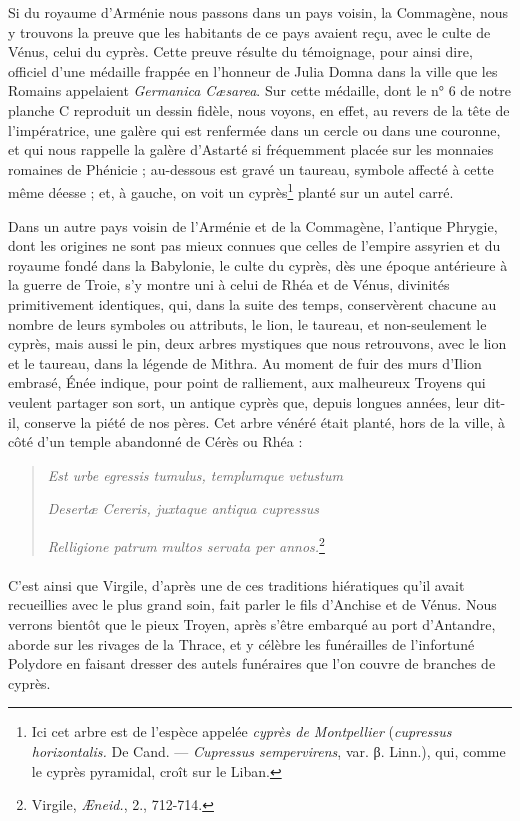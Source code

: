 \documentclass[a4paper, 11pt, oneside, polutonikogreek, french]{article}
\begin{document}
Si du royaume d'Arménie nous passons dans un pays voisin, la Commagène, nous y trouvons la preuve que les habitants de ce pays avaient reçu, avec le culte de Vénus, celui du cyprès. Cette preuve résulte du témoignage, pour ainsi dire, officiel d'une médaille frappée en l'honneur de Julia Domna dans la ville que les Romains appelaient \emph{Germanica Cæsarea}. Sur cette médaille, dont le n° 6 de notre planche C reproduit un dessin fidèle, nous voyons, en effet, au revers de la tête de l'impératrice, une galère qui est renfermée dans un cercle ou dans une couronne, et qui nous rappelle la galère d'Astarté si fréquemment placée sur les monnaies romaines de Phénicie ; au-dessous est gravé un taureau, symbole affecté à cette même déesse ; et, à gauche, on voit un cyprès\footnote{Ici cet arbre est de l'espèce appelée \emph{cyprès de Montpellier} (\emph{cupressus horizontalis.} De Cand. --- \emph{Cupressus sempervirens}, var. β. Linn.), qui, comme le cyprès pyramidal, croît sur le Liban.} planté sur un autel carré.

Dans un autre pays voisin de l'Arménie et de la Commagène, l'antique Phrygie, dont les origines ne sont pas mieux connues que celles de l'empire assyrien et du royaume fondé dans la Babylonie, le culte du cyprès, dès une époque antérieure à la guerre de Troie, s'y montre uni à celui de Rhéa et de Vénus, divinités primitivement identiques, qui, dans la suite des temps, conservèrent chacune au nombre de leurs symboles ou attributs, le lion, le taureau, et non-seulement le cyprès, mais aussi le pin, deux arbres mystiques que nous retrouvons, avec le lion et le taureau, dans la légende de Mithra. Au moment de fuir des murs d'Ilion embrasé, Énée indique, pour point de ralliement, aux malheureux Troyens qui veulent partager son sort, un antique cyprès que, depuis longues années, leur dit-il, conserve la piété de nos pères. Cet arbre vénéré était planté, hors de la ville, à côté d'un temple abandonné de Cérès ou Rhéa :

\begin{quotation}\small

\emph{Est urbe egressis tumulus, templumque vetustum}

\emph{Desertæ Cereris, juxtaque antiqua cupressus}

\emph{Relligione patrum multos servata per annos.}\footnote{Virgile, \emph{Æneid.}, 2., 712-714.}
\end{quotation}

\paragraph{}
C'est ainsi que Virgile, d'après une de ces traditions hiératiques qu'il avait recueillies avec le plus grand soin, fait parler le fils d'Anchise et de Vénus. Nous verrons bientôt que le pieux Troyen, après s'être embarqué au port d'Antandre, aborde sur les rivages de la Thrace, et y célèbre les funérailles de l'infortuné Polydore en faisant dresser des autels funéraires que l'on couvre de branches de cyprès.
\end{document}
